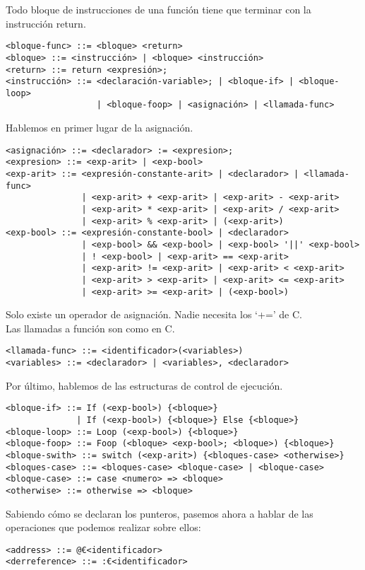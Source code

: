 \documentclass[spanish, a4paper, 12pt] {article}
\begin{document}
Todo bloque de instrucciones de una función tiene que terminar con la instrucción return.
\begin{verbatim}
<bloque-func> ::= <bloque> <return>
<bloque> ::= <instrucción> | <bloque> <instrucción>
<return> ::= return <expresión>;
<instrucción> ::= <declaración-variable>; | <bloque-if> | <bloque-loop>
                  | <bloque-foop> | <asignación> | <llamada-func>
\end{verbatim}
Hablemos en primer lugar de la asignación.
\begin{verbatim}
<asignación> ::= <declarador> := <expresion>;
<expresion> ::= <exp-arit> | <exp-bool>
<exp-arit> ::= <expresión-constante-arit> | <declarador> | <llamada-func>
               | <exp-arit> + <exp-arit> | <exp-arit> - <exp-arit>
               | <exp-arit> * <exp-arit> | <exp-arit> / <exp-arit>
               | <exp-arit> % <exp-arit> | (<exp-arit>)
<exp-bool> ::= <expresión-constante-bool> | <declarador>
               | <exp-bool> && <exp-bool> | <exp-bool> '||' <exp-bool>
               | ! <exp-bool> | <exp-arit> == <exp-arit>
               | <exp-arit> != <exp-arit> | <exp-arit> < <exp-arit>
               | <exp-arit> > <exp-arit> | <exp-arit> <= <exp-arit>
               | <exp-arit> >= <exp-arit> | (<exp-bool>)
\end{verbatim}
Solo existe un operador de asignación. Nadie necesita los `+=' de C.\\

Las llamadas a función son como en C.
\begin{verbatim}
<llamada-func> ::= <identificador>(<variables>)
<variables> ::= <declarador> | <variables>, <declarador>
\end{verbatim}
Por último, hablemos de las estructuras de control de ejecución.
\begin{verbatim}
<bloque-if> ::= If (<exp-bool>) {<bloque>}
              | If (<exp-bool>) {<bloque>} Else {<bloque>}
<bloque-loop> ::= Loop (<exp-bool>) {<bloque>}
<bloque-foop> ::= Foop (<bloque> <exp-bool>; <bloque>) {<bloque>}
<bloque-swith> ::= switch (<exp-arit>) {<bloques-case> <otherwise>}
<bloques-case> ::= <bloques-case> <bloque-case> | <bloque-case>
<bloque-case> ::= case <numero> => <bloque>
<otherwise> ::= otherwise => <bloque>
\end{verbatim}

Sabiendo cómo se declaran los punteros, pasemos ahora a hablar de las operaciones que podemos realizar sobre ellos:

\begin{verbatim}
<address> ::= @€<identificador>
<derreference> ::= :€<identificador>
\end{verbatim}
\end{document}
